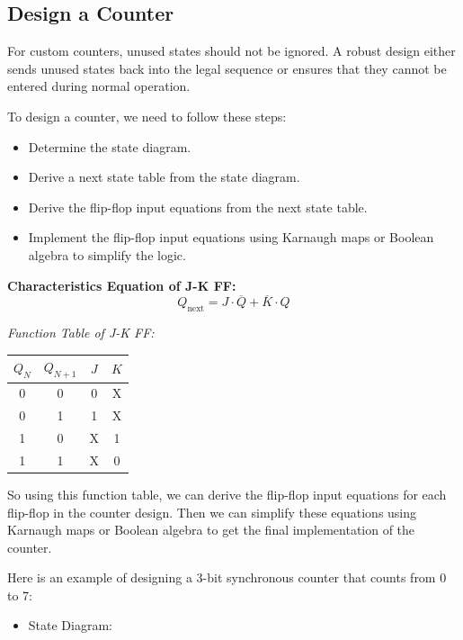 \documentclass[11pt,a4paper]{article}
\providecommand{\tightlist}{\setlength{\itemsep}{1pt}\setlength{\parskip}{0pt}}
\begin{document}
\subsection{Design a Counter}\label{design-a-counter}

For custom counters, unused states should not be ignored. A robust
design either sends unused states back into the legal sequence or
ensures that they cannot be entered during normal operation.

To design a counter, we need to follow these steps:

\begin{itemize}
\tightlist
\item
  Determine the state diagram.
\item
  Derive a next state table from the state diagram.
\item
  Derive the flip-flop input equations from the next state table.
\item
  Implement the flip-flop input equations using Karnaugh maps or Boolean
  algebra to simplify the logic.
\end{itemize}

\textbf{Characteristics Equation of J-K FF:}
\[Q_{\text{next}} = J \cdot \overline{Q} + \overline{K} \cdot Q\]

\emph{Function Table of J-K FF:}

\begin{center}
\small
\begin{tabular}{cccc}
\toprule
$Q_N$ & $Q_{N+1}$ & $J$ & $K$ \\
\midrule
0 & 0 & 0 & X \\
0 & 1 & 1 & X \\
1 & 0 & X & 1 \\
1 & 1 & X & 0 \\
\bottomrule
\end{tabular}
\end{center}

So using this function table, we can derive the flip-flop input
equations for each flip-flop in the counter design. Then we can simplify
these equations using Karnaugh maps or Boolean algebra to get the final
implementation of the counter.

Here is an example of designing a 3-bit synchronous counter that counts
from 0 to 7:

\begin{itemize}
\tightlist
\item
  State Diagram:
\end{itemize}
\end{document}
